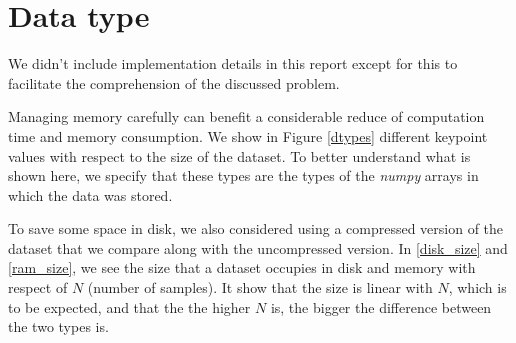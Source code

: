 \documentclass[12pt, a4paper]{report}
\begin{document}
	\chapter{Data type}\label{appendix_d}
		We didn't include implementation details in this report except for this to facilitate the comprehension of the discussed problem.
		\par
		Managing memory carefully can benefit a considerable reduce of computation time and memory consumption.
		We show in Figure \ref{dtypes} different keypoint values with respect to the size of the dataset.
		To better understand what is shown here, we specify that these types are the types of the {\itshape numpy} arrays in which the data was stored.
		\par
		To save some space in disk, we also considered using a compressed version of the dataset that we compare along with the uncompressed version.
		In \ref{disk_size} and \ref{ram_size}, we see the size that a dataset occupies in disk and memory with respect of $N$ (number of samples).
		It show that the size is linear with $N$, which is to be expected, and that the the higher $N$ is, the bigger the difference between the two types is.
\end{document}
